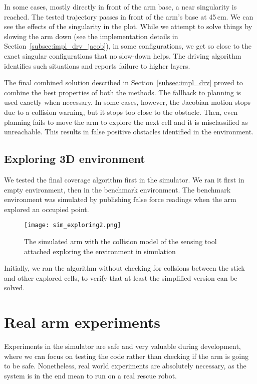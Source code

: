\documentclass[buriama8_dp.tex]{subfiles}
\begin{document}
In some cases, mostly directly in front of the arm base, a near singularity is reached. The tested trajectory passes in front of the arm's base at 45\,cm. We can see the effects of the singularity in the plot. While we attempt to solve things by slowing the arm down (see the implementation details in Section~\ref{subsec:impl_drv_jacob}), in some configurations, we get so close to the exact singular configurations that no slow-down helps. The driving algorithm identifies such situations and reports failure to higher layers.

The final combined solution described in Section~\ref{subsec:impl_drv} proved to combine the best properties of both the methods. The fallback to planning is used exactly when necessary. In some cases, however, the Jacobian motion stops due to a collision warning, but it stops too close to the obstacle. Then, even planning fails to move the arm to explore the next cell and it is misclassified as unreachable. This results in false positive obstacles identified in the environment.

\subsection{Exploring 3D environment}
\label{subsec:sim_arm_cover}

We tested the final coverage algorithm first in the simulator. We ran it first in empty environment, then in the benchmark environment. The benchmark environment was simulated by publishing false force readings when the arm explored an occupied point.

\begin{figure}[ht]
  \centering
  \texttt{[image: sim\_exploring2.png]}
  \caption{The simulated arm with the collision model of the sensing tool attached exploring the environment in simulation}
  \label{fig:sim_expl}
\end{figure}

Initially, we ran the algorithm without checking for collsions between the stick and other explored cells, to verify that at least the simplified version can be solved. 



\section{Real arm experiments}
\label{sec:exp_real_arm}

Experiments in the simulator are safe and very valuable during development, where we can focus on testing the code rather than checking if the arm is going to be safe. Nonetheless, real world experiments are absolutely necessary, as the system is in the end mean to run on a real rescue robot.
\end{document}
